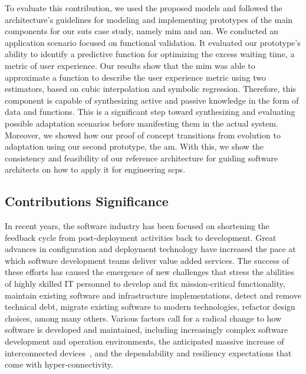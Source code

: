 \begin{description}[style=unboxed,leftmargin=0cm,font=\bfseries\normalsize]
	To evaluate this contribution, we used the proposed models and followed the architecture's guidelines for modeling and implementing prototypes of the main components for our \gls{suts} case study, namely \gls{mim} and \gls{am}. We conducted an application scenario focused on functional validation. It evaluated our prototype's ability to identify a predictive function for optimizing the excess waiting time, a metric of user experience. Our results show that the \gls{mim} was able to approximate a function to describe the user experience metric using two estimators, based on cubic interpolation and symbolic regression. Therefore, this component is capable of synthesizing active and passive knowledge in the form of data and functions. This is a significant step toward synthesizing and evaluating possible adaptation scenarios before manifesting them in the actual system. Moreover, we showed how our proof of concept transitions from evolution to adaptation using our second prototype, the \gls{am}. With this, we show the consistency and feasibility of our reference architecture for guiding software architects on how to apply it for engineering \gls{scps}.
\end{description}


\subsection{Contributions Significance}
\label{subsect:conclusions--significance}


In recent years, the software industry has been focused on shortening the feedback cycle from post-deployment activities back to development. Great advances in configuration and deployment technology have increased the pace at which software development teams deliver value added services. The success of these efforts has caused the emergence of new challenges that stress the abilities of highly skilled IT personnel to develop and fix mission-critical functionality, maintain existing software and infrastructure implementations, detect and remove technical debt, migrate existing software to modern technologies, refactor design choices, among many others. Various factors call for a radical change to how software is developed and maintained, including increasingly complex software development and operation environments, the anticipated massive increase of interconnected devices~\cite{alsen-2017-future,dahlqvist-2019-growing}, and the dependability and resiliency expectations that come with hyper-connectivity. 

